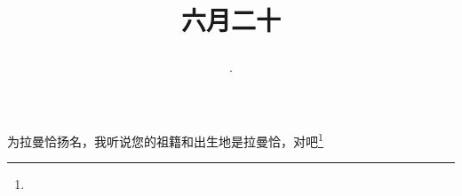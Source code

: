 \title{\date[d=25,m=7,y=2024][year:cn-y,年,month:cn,day:cn,日,·,weekday]·六月二十 }
为拉曼恰扬名，我听说您的祖籍和出生地是拉曼恰，对吧\footnote{ }

